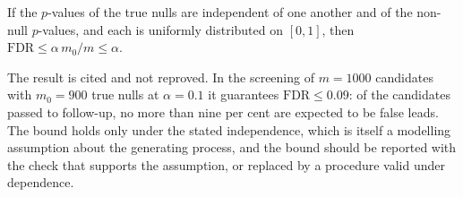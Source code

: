 \begin{proposition}
If the $p$-values of the true nulls are independent of one another and of the non-null $p$-values, and each is uniformly distributed on $[0,1]$, then $\mathrm{FDR}\le\alpha\,m_0/m\le\alpha$.
\end{proposition}

The result is cited and not reproved. In the screening of $m=1000$ candidates with $m_0=900$ true nulls at $\alpha=0.1$ it guarantees $\mathrm{FDR}\le0.09$: of the candidates passed to follow-up, no more than nine per cent are expected to be false leads. The bound holds only under the stated independence, which is itself a modelling assumption about the generating process, and the bound should be reported with the check that supports the assumption, or replaced by a procedure valid under dependence.
